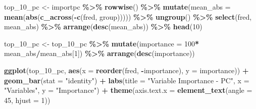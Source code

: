 \documentclass[
]{article}
\newenvironment{Shaded}{\begin{snugshade}}{\end{snugshade}}
\newcommand{\AttributeTok}[1]{\textcolor[rgb]{0.13,0.29,0.53}{#1}}
\newcommand{\DecValTok}[1]{\textcolor[rgb]{0.00,0.00,0.81}{#1}}
\newcommand{\FunctionTok}[1]{\textcolor[rgb]{0.13,0.29,0.53}{\textbf{#1}}}
\newcommand{\NormalTok}[1]{#1}
\newcommand{\OtherTok}[1]{\textcolor[rgb]{0.56,0.35,0.01}{#1}}
\newcommand{\SpecialCharTok}[1]{\textcolor[rgb]{0.81,0.36,0.00}{\textbf{#1}}}
\newcommand{\StringTok}[1]{\textcolor[rgb]{0.31,0.60,0.02}{#1}}
\begin{document}
\begin{Shaded}
\begin{Highlighting}[]
\NormalTok{top\_10\_pc }\OtherTok{\textless{}{-}}\NormalTok{ importpc }\SpecialCharTok{\%\textgreater{}\%}
  \FunctionTok{rowwise}\NormalTok{() }\SpecialCharTok{\%\textgreater{}\%}
  \FunctionTok{mutate}\NormalTok{(}\AttributeTok{mean\_abs =} \FunctionTok{mean}\NormalTok{(}\FunctionTok{abs}\NormalTok{(}\FunctionTok{c\_across}\NormalTok{(}\SpecialCharTok{{-}}\FunctionTok{c}\NormalTok{(fred, group))))) }\SpecialCharTok{\%\textgreater{}\%}
  \FunctionTok{ungroup}\NormalTok{() }\SpecialCharTok{\%\textgreater{}\%}
  \FunctionTok{select}\NormalTok{(fred, mean\_abs) }\SpecialCharTok{\%\textgreater{}\%}
  \FunctionTok{arrange}\NormalTok{(}\FunctionTok{desc}\NormalTok{(mean\_abs)) }\SpecialCharTok{\%\textgreater{}\%}
  \FunctionTok{head}\NormalTok{(}\DecValTok{10}\NormalTok{)}

\NormalTok{top\_10\_pc }\OtherTok{\textless{}{-}}\NormalTok{ top\_10\_pc }\SpecialCharTok{\%\textgreater{}\%} \FunctionTok{mutate}\NormalTok{(}\AttributeTok{importance =} \DecValTok{100}\SpecialCharTok{*}\NormalTok{ mean\_abs}\SpecialCharTok{/}\NormalTok{mean\_abs[}\DecValTok{1}\NormalTok{]) }\SpecialCharTok{\%\textgreater{}\%} \FunctionTok{arrange}\NormalTok{(}\FunctionTok{desc}\NormalTok{(importance))}

\FunctionTok{ggplot}\NormalTok{(top\_10\_pc, }\FunctionTok{aes}\NormalTok{(}\AttributeTok{x =} \FunctionTok{reorder}\NormalTok{(fred, }\SpecialCharTok{{-}}\NormalTok{importance), }\AttributeTok{y =}\NormalTok{ importance)) }\SpecialCharTok{+}
  \FunctionTok{geom\_bar}\NormalTok{(}\AttributeTok{stat =} \StringTok{"identity"}\NormalTok{) }\SpecialCharTok{+}
  \FunctionTok{labs}\NormalTok{(}\AttributeTok{title =} \StringTok{"Variable Importance {-} PC"}\NormalTok{,}
       \AttributeTok{x =} \StringTok{"Variables"}\NormalTok{,}
       \AttributeTok{y =} \StringTok{"Importance"}\NormalTok{) }\SpecialCharTok{+}
  \FunctionTok{theme}\NormalTok{(}\AttributeTok{axis.text.x =} \FunctionTok{element\_text}\NormalTok{(}\AttributeTok{angle =} \DecValTok{45}\NormalTok{, }\AttributeTok{hjust =} \DecValTok{1}\NormalTok{))}
\end{Highlighting}
\end{Shaded}
\end{document}
